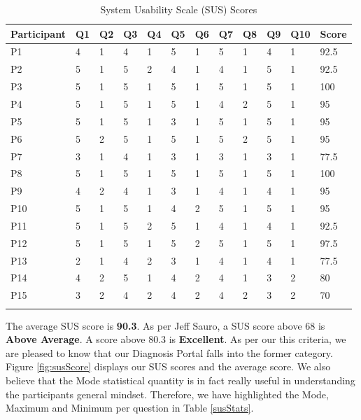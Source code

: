 \begin{longtable}{| p{} | p{} | p{} | p{} | p{} | p{} | p{} | p{} | p{} | p{} | p{} | p{} |} 
    \hline
    		\textbf{Participant}    &\textbf{Q1}    &\textbf{Q2}    &\textbf{Q3}    &\textbf{Q4}    &\textbf{Q5}    &\textbf{Q6}   &\textbf{Q7}    &\textbf{Q8}    &\textbf{Q9}    &\textbf{Q10}   &\textbf{Score} 
\\\hline
P1   &4   &1   &4   &1   &5   &1   &5   &1   &4   &1   &92.5 \\\hline
P2   &5   &1   &5   &2   &4   &1   &4   &1   &5   &1   &92.5 \\\hline
P3   &5   &1   &5   &1   &5   &1   &5   &1   &5   &1   &100 \\\hline
P4   &5   &1   &5   &1   &5   &1   &4   &2   &5   &1   &95 \\\hline
P5   &5   &1   &5   &1   &3   &1   &5   &1   &5   &1   &95 \\\hline
P6   &5   &2   &5   &1   &5   &1   &5   &2   &5   &1   &95 \\\hline
P7   &3   &1   &4   &1   &3   &1   &3   &1   &3   &1   &77.5 \\\hline
P8   &5   &1   &5   &1   &5   &1   &5   &1   &5   &1   &100 \\\hline
P9   &4   &2   &4   &1   &3   &1   &4   &1   &4   &1   &95 \\\hline
P10  &5   &1   &5   &1   &4   &2   &5   &1   &5   &1   &95 \\\hline
P11  &5   &1   &5   &2   &5   &1   &4   &1   &4   &1   &92.5 \\\hline
P12  &5   &1   &5   &1   &5   &2   &5   &1   &5   &1   &97.5 \\\hline
P13  &2   &1   &4   &2   &3   &1   &4   &1   &4   &1   &77.5 \\\hline
P14  &4   &2   &5   &1   &4   &2   &4   &1   &3   &2   &80 \\\hline
P15  &3   &2   &4   &2   &4   &2   &4   &2   &3   &2   &70 \\\hline
\caption{System Usability Scale (SUS) Scores} \label{susScores}
\end{longtable}


The average SUS score is \textbf{90.3}. As per Jeff Sauro, a SUS score above 68 is \textbf{Above Average}. A score above 80.3 is \textbf{Excellent}. As per our this criteria, we are pleased to know that our Diagnosis Portal falls into the former category. Figure \ref{fig:susScore} displays our SUS scores and the average score. We also believe that the Mode statistical quantity is in fact really useful in understanding the participants general mindset. Therefore, we have highlighted the Mode, Maximum and Minimum per question in Table \ref{susStats}. 

